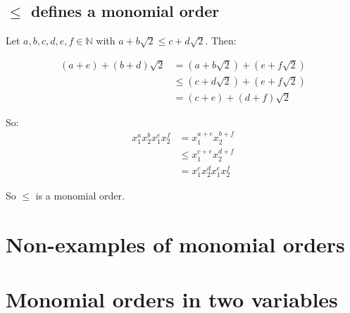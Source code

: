 \documentclass[a4paper]{scrreprt}
\begin{document}
\subsection{$\leq$ defines a monomial order}

Let $a, b, c, d, e, f \in \mathbb{N}$ with $a + b \sqrt{2} \leq c + d
\sqrt{2}$. Then:

\begin{align*}
		(a + e) + (b + d) \sqrt{2} & = (a + b \sqrt{2}) + (e + f \sqrt{2}) \\
								   & \leq (c + d \sqrt{2}) + (e + f \sqrt{2}) \\
								   & = (c + e) + (d + f) \sqrt{2}
\end{align*}

So:
\begin{align*}
		x_1^a x_2^b x_1^e x_2^f & = x_1^{a+e} x_2^{b+f} \\
								& \leq x_1^{c+e} x_2^{d+f} \\
								& = x_1^c x_2^d x_1^e x_2^f
\end{align*}

So $\leq$ is a monomial order.

\section{Non-examples of monomial orders}

\section{Monomial orders in two variables}

\printbibliography{}
\end{document}
